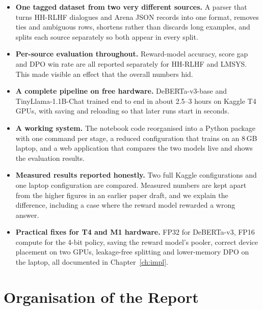 \begin{itemize}
  \item \textbf{One tagged dataset from two very different sources.} A parser that turns HH-RLHF dialogues and Arena JSON records into one format, removes ties and ambiguous rows, shortens rather than discards long examples, and splits each source separately so both appear in every split.
  \item \textbf{Per-source evaluation throughout.} Reward-model accuracy, score gap and DPO win rate are all reported separately for HH-RLHF and LMSYS. This made visible an effect that the overall numbers hid.
  \item \textbf{A complete pipeline on free hardware.} DeBERTa-v3-base and TinyLlama-1.1B-Chat trained end to end in about 2.5--3 hours on Kaggle T4 GPUs, with saving and reloading so that later runs start in seconds.
  \item \textbf{A working system.} The notebook code reorganised into a Python package with one command per stage, a reduced configuration that trains on an 8\,GB laptop, and a web application that compares the two models live and shows the evaluation results.
  \item \textbf{Measured results reported honestly.} Two full Kaggle configurations and one laptop configuration are compared. Measured numbers are kept apart from the higher figures in an earlier paper draft, and we explain the difference, including a case where the reward model rewarded a wrong answer.
  \item \textbf{Practical fixes for T4 and M1 hardware.} FP32 for DeBERTa-v3, FP16 compute for the 4-bit policy, saving the reward model's pooler, correct device placement on two GPUs, leakage-free splitting and lower-memory DPO on the laptop, all documented in Chapter~\ref{ch:impl}.
\end{itemize}

\section{Organisation of the Report}
\label{sec:organisation}

